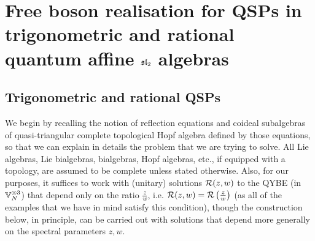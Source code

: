 \section{\texorpdfstring{Free boson realisation for QSPs in trigonometric and rational quantum affine $\sl_2$ algebras}{}}
    \subsection{\texorpdfstring{Trigonometric and rational QSPs}{}}
        We begin by recalling the notion of reflection equations and coideal subalgebras of quasi-triangular complete topological Hopf algebra defined by those equations, so that we can explain in details the problem that we are trying to solve. All Lie algebras, Lie bialgebras, bialgebras, Hopf algebras, etc., if equipped with a topology, are assumed to be complete unless stated otherwise. Also, for our purposes, it suffices to work with (unitary) solutions $\calR(z, w)$ to the QYBE (in $\bbV_N^{\tensor 3}$) that depend only on the ratio $\frac{z}{w}$, i.e. $\calR(z, w) = \calR\left(\frac{z}{w}\right)$ (as all of the examples that we have in mind satisfy this condition), though the construction below, in principle, can be carried out with solutions that depend more generally on the spectral parameters $z, w$.
        
